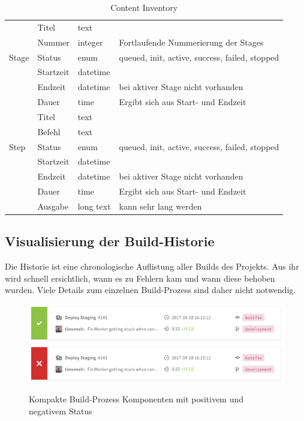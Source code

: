 \begin{table}[H]
\begin{tabularx}{\textwidth}{| l | p{3cm} | l | X |}
    \multirow{5}{*}{Stage} & Titel & text &  \\ \cline{2-4}
      & Nummer & integer & Fortlaufende Nummerierung der Stages \\ \cline{2-4}
      & Status & enum & queued, init, active, success, failed, stopped \\ \cline{2-4}
      & Startzeit & datetime &  \\ \cline{2-4}
      & Endzeit & datetime & bei aktiver Stage nicht vorhanden \\ \cline{2-4}
      & Dauer & time & Ergibt sich aus Start- und Endzeit \\ \hline
    \multirow{5}{*}{Step} & Titel & text &  \\ \cline{2-4}
      & Befehl & text &  \\ \cline{2-4}
      & Status & enum & queued, init, active, success, failed, stopped \\ \cline{2-4}
      & Startzeit & datetime &  \\ \cline{2-4}
      & Endzeit & datetime & bei aktiver Stage nicht vorhanden \\ \cline{2-4}
      & Dauer & time & Ergibt sich aus Start- und Endzeit \\ \cline{2-4}
      & Ausgabe & long text & kann sehr lang werden \\ \hline
  \end{tabularx}
  \caption{Content Inventory}
  \label{tab:content-inventory}
\end{table}

\subsection{Visualisierung der Build-Historie}
\label{subsec:visualisierung-build-history}

Die Historie ist eine chronologische Auflistung aller Builds des Projekts. Aus ihr wird schnell ersichtlich, wann es zu Fehlern kam und wann diese behoben wurden. Viele Details zum einzelnen Build-Prozess sind daher nicht notwendig.

\begin{figure}[h]
  \caption{Kompakte Build-Prozess Komponenten mit positivem und negativem Status}
  \label{fig:build-process-short}
  \centering
    \includegraphics[width=\textwidth]{assets/build-overview-finished}
    \includegraphics[width=\textwidth]{assets/build-overview-failed}
\end{figure}

